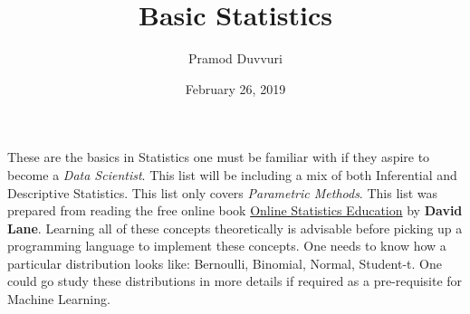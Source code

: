 \documentclass[11pt]{article}
\title{Basic Statistics}
\author{Pramod Duvvuri}
\date{February 26, 2019}
\begin{document}
\maketitle
These are the basics in Statistics one must be familiar with if they aspire to become a \textit{Data Scientist}. This list will be including a mix of both Inferential and Descriptive Statistics. This list only covers \textit{Parametric Methods}. This list was prepared from reading the free online book \href{http://onlinestatbook.com}{Online Statistics Education} by \textbf{David Lane}. Learning all of these concepts theoretically is advisable before picking up a programming language to implement these concepts. One needs to know how a particular distribution looks like: Bernoulli, Binomial, Normal, Student-t. One could go study these distributions in more details if required as a pre-requisite for Machine Learning.
\end{document}

